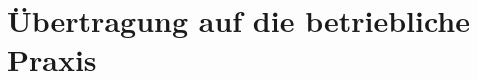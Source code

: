 \documentclass[../main.tex]{subfiles}
\begin{document}
  \section{Übertragung auf die betriebliche Praxis}
\end{document}
